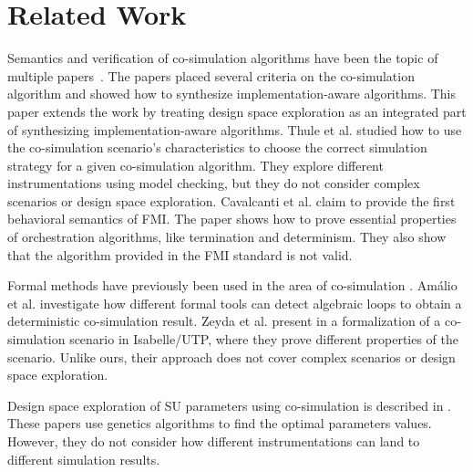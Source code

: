 \section{Related Work}\label{sc:related}
Semantics and verification of co-simulation algorithms have been the topic of multiple papers~\cite{Gomes2019c,Gomes2019a,Broman2013,thrane2021,sampaio_behavioural_2016}. 
The papers \cite{thrane2021} placed several criteria on the co-simulation algorithm and showed how to synthesize implementation-aware algorithms.
This paper extends the work by treating design space exploration as an integrated part of synthesizing implementation-aware algorithms. 
Thule et al. \cite{Thule_2018} studied how to use the co-simulation scenario's characteristics to choose the correct simulation strategy for a given co-simulation algorithm.
They explore different instrumentations using model checking, but they do not consider complex scenarios or design space exploration.
Cavalcanti et al. \cite{sampaio_behavioural_2016} claim to provide the first behavioral semantics of FMI. 
The paper shows how to prove essential properties of orchestration algorithms, like termination and determinism. 
They also show that the algorithm provided in the FMI standard is not valid. 

Formal methods have previously been used in the area of co-simulation \cite{Amalio2016,sampaio_behavioural_2016,cerone_formalising_2018,hansen_verification_2021}.
Amálio et al. \cite{Amalio2016} investigate how different formal tools can detect algebraic loops to obtain a deterministic co-simulation result. 
Zeyda et al. present in \cite{cerone_formalising_2018}  a formalization of a co-simulation scenario in Isabelle/UTP, where they prove different properties of the scenario.
Unlike ours, their approach does not cover complex scenarios or design space exploration.

Design space exploration of SU parameters using co-simulation is described in \cite{dse,gamble_design_2014}.
These papers use genetics algorithms to find the optimal parameters values.
However, they do not consider how different instrumentations can land to different simulation results.

